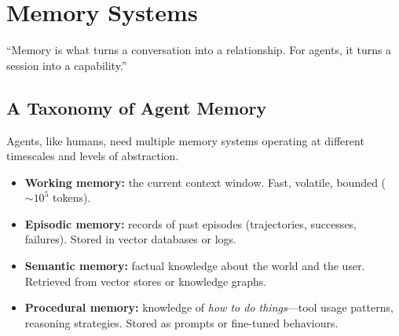 \chapter{Memory Systems}
\label{ch:memory}

\epigraph{``Memory is what turns a conversation into a relationship. For agents, it turns a session into a capability.''}{}


\section{A Taxonomy of Agent Memory}

Agents, like humans, need multiple memory systems operating at different timescales and levels of abstraction.

\begin{definition}
	\begin{itemize}
		\item \textbf{Working memory:} the current context window. Fast, volatile, bounded ($\sim 10^5$ tokens).
		\item \textbf{Episodic memory:} records of past episodes (trajectories, successes, failures). Stored in vector databases or logs.
		\item \textbf{Semantic memory:} factual knowledge about the world and the user. Retrieved from vector stores or knowledge graphs.
		\item \textbf{Procedural memory:} knowledge of \emph{how to do things}---tool usage patterns, reasoning strategies. Stored as prompts or fine-tuned behaviours.
	\end{itemize}
\end{definition}

